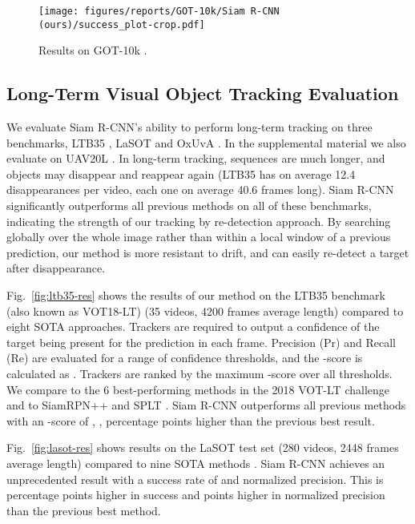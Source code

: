 \documentclass[10pt,twocolumn,letterpaper]{article}
\newcommand{\PAR}[1]{\vskip1pt \noindent {\bf #1~}}
\begin{document}
\begin{figure}[t]
\centering
\texttt{[image: figures/reports/GOT-10k/Siam R-CNN (ours)/success\_plot-crop.pdf]}
\caption{Results on GOT-10k \cite{Huang18Arxiv}.}
\label{fig:got10k-res}
\end{figure}

\subsection{Long-Term Visual Object Tracking Evaluation}
We evaluate Siam R-CNN's ability to perform long-term tracking on three benchmarks, LTB35 \cite{lukevzivc2018now}, LaSOT \cite{Fan19CVPRLASOT} and OxUvA \cite{Valmadre18ECCV}. In the supplemental material we also evaluate on UAV20L \cite{Mueller16ECCV}. In long-term tracking, sequences are much longer, and objects may disappear and reappear again (LTB35 has on average 12.4 disappearances per video, each one on average 40.6 frames long).
Siam R-CNN significantly outperforms all previous methods on all of these benchmarks, indicating the strength of our tracking by re-detection approach. By searching globally over the whole image rather than within a local window of a previous prediction, our method is more resistant to drift, and can easily re-detect a target after disappearance.

\PAR{LTB35.}
Fig.~\ref{fig:ltb35-res} shows the results of our method on the LTB35 benchmark (also known as VOT18-LT) \cite{lukevzivc2018now} (35 videos, 4200 frames average length) compared to eight SOTA approaches.
Trackers are required to output a confidence of the target being present for the prediction in each frame. Precision (Pr) and Recall (Re) are evaluated for a range of confidence thresholds, and the -score is calculated as . Trackers are ranked by the maximum -score over all thresholds.
We compare to the 6 best-performing methods in the 2018 VOT-LT challenge \cite{Kristan18ECCVW} and to SiamRPN++ \cite{Li19CVPR} and SPLT \cite{Yan19ICCV}.
Siam R-CNN outperforms all previous methods with an -score of , \ie,  percentage points higher than the previous best result.

\PAR{LaSOT.}
Fig.~\ref{fig:lasot-res} shows results on the LaSOT test set \cite{Fan19CVPRLASOT} (280 videos, 2448 frames average length) compared to nine SOTA methods \cite{Bhat19ICCV, Danelljan19CVPR, Li19CVPR, mdnet, Song18CVPR, Bertinetto2016ECCV, zhang2018structured, guo2017learning, Danelljan17CVPR}. Siam R-CNN achieves an unprecedented result with a success rate of  and  normalized precision. This is  percentage points higher in success and  points higher in normalized precision than the previous best method.
\end{document}

